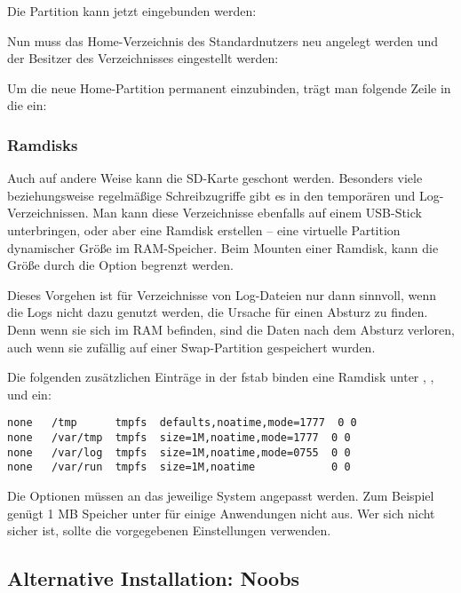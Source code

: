Die Partition kann jetzt eingebunden werden:


Nun muss das Home-Verzeichnis des Standardnutzers neu angelegt werden und der Besitzer des Verzeichnisses eingestellt werden:



Um die neue Home-Partition permanent einzubinden, trägt man folgende Zeile in die  ein:


 
\subsubsection{Ramdisks}

Auch auf andere Weise kann die SD-Karte geschont werden. Besonders viele beziehungsweise regelmäßige Schreibzugriffe gibt es in den temporären und Log-Verzeichnissen. Man kann diese Verzeichnisse ebenfalls auf einem USB-Stick unterbringen, oder aber eine Ramdisk erstellen – eine virtuelle Partition dynamischer Größe im RAM-Speicher. Beim Mounten einer Ramdisk, kann die Größe durch die Option  begrenzt werden.

Dieses Vorgehen ist für Verzeichnisse von Log-Dateien nur dann sinnvoll, wenn die Logs nicht dazu genutzt werden, die Ursache für einen Absturz zu finden. Denn wenn sie sich im RAM befinden, sind die Daten nach dem Absturz verloren, auch wenn sie zufällig auf einer Swap-Partition gespeichert wurden.

Die folgenden zusätzlichen Einträge in der fstab binden eine Ramdisk unter , ,  und  ein:


\begin{lstlisting}
none   /tmp      tmpfs  defaults,noatime,mode=1777  0 0
none   /var/tmp  tmpfs  size=1M,noatime,mode=1777  0 0
none   /var/log  tmpfs  size=1M,noatime,mode=0755  0 0
none   /var/run  tmpfs  size=1M,noatime            0 0
\end{lstlisting}

Die Optionen müssen an das jeweilige System angepasst werden. Zum Beispiel genügt 1 MB Speicher unter  für einige Anwendungen nicht aus. Wer sich nicht sicher ist, sollte die vorgegebenen Einstellungen verwenden.

\subsection{Alternative Installation: Noobs}


